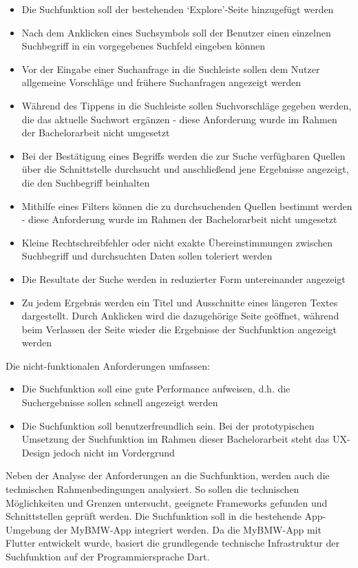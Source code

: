 \documentclass[
  12pt,
  a4paperpaper,
]{report}
\providecommand{\tightlist}{%
  \setlength{\itemsep}{0pt}\setlength{\parskip}{0pt}}
\begin{document}
\begin{itemize}
\tightlist
\item
  Die Suchfunktion soll der bestehenden `Explore'-Seite hinzugefügt
  werden
\item
  Nach dem Anklicken eines Suchsymbols soll der Benutzer einen einzelnen
  Suchbegriff in ein vorgegebenes Suchfeld eingeben können
\item
  Vor der Eingabe einer Suchanfrage in die Suchleiste sollen dem Nutzer
  allgemeine Vorschläge und frühere Suchanfragen angezeigt werden
\item
  Während des Tippens in die Suchleiste sollen Suchvorschläge gegeben
  werden, die das aktuelle Suchwort ergänzen - diese Anforderung wurde
  im Rahmen der Bachelorarbeit nicht umgesetzt
\item
  Bei der Bestätigung eines Begriffs werden die zur Suche verfügbaren
  Quellen über die Schnittstelle durchsucht und anschließend jene
  Ergebnisse angezeigt, die den Suchbegriff beinhalten
\item
  Mithilfe eines Filters können die zu durchsuchenden Quellen bestimmt
  werden - diese Anforderung wurde im Rahmen der Bachelorarbeit nicht
  umgesetzt
\item
  Kleine Rechtschreibfehler oder nicht exakte Übereinstimmungen zwischen
  Suchbegriff und durchsuchten Daten sollen toleriert werden
\item
  Die Resultate der Suche werden in reduzierter Form untereinander
  angezeigt
\item
  Zu jedem Ergebnis werden ein Titel und Ausschnitte eines längeren
  Textes dargestellt. Durch Anklicken wird die dazugehörige Seite
  geöffnet, während beim Verlassen der Seite wieder die Ergebnisse der
  Suchfunktion angezeigt werden
\end{itemize}

Die nicht-funktionalen Anforderungen umfassen:

\begin{itemize}
\tightlist
\item
  Die Suchfunktion soll eine gute Performance aufweisen, d.h. die
  Suchergebnisse sollen schnell angezeigt werden
\item
  Die Suchfunktion soll benutzerfreundlich sein. Bei der prototypischen
  Umsetzung der Suchfunktion im Rahmen dieser Bachelorarbeit steht das
  UX-Design jedoch nicht im Vordergrund
\end{itemize}

Neben der Analyse der Anforderungen an die Suchfunktion, werden auch die
technischen Rahmenbedingungen analysiert. So sollen die technischen
Möglichkeiten und Grenzen untersucht, geeignete Frameworks gefunden und
Schnittstellen geprüft werden. Die Suchfunktion soll in die bestehende
App-Umgebung der MyBMW-App integriert werden. Da die MyBMW-App mit
Flutter entwickelt wurde, basiert die grundlegende technische
Infrastruktur der Suchfunktion auf der Programmiersprache Dart.
\end{document}
